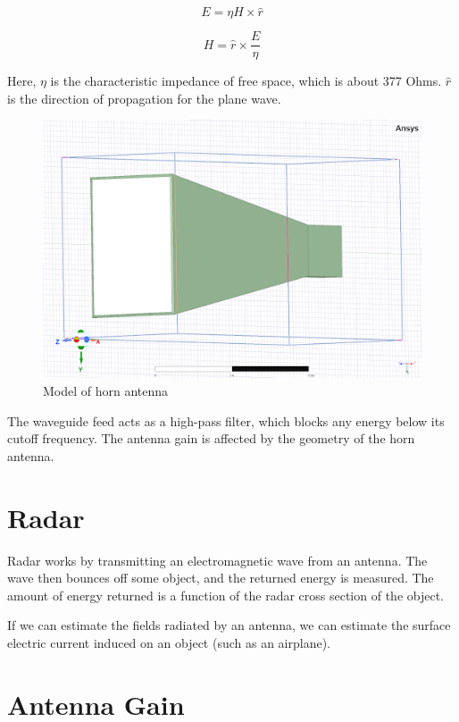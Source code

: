 \documentclass[a4paper,12pt]{report}
\begin{document}
\begin{equation}
  E = \eta H \times \hat{r}
\end{equation}

\begin{equation}
  H = \hat{r} \times \frac{E}{\eta}
\end{equation}

Here, $\eta$ is the characteristic impedance of free space,
which is about 377 Ohms. $\hat{r}$ is the direction of propagation for the plane wave.

\begin{figure}
  \begin{center}
    \includegraphics[clip, keepaspectratio, width=0.5\linewidth]{img/horn_antenna_model.png}
    \caption{Model of horn antenna}
    \label{fig:model_horn_antenna}
  \end{center}
\end{figure}

The waveguide feed acts as a high-pass filter,
which blocks any energy below its cutoff frequency.
The antenna gain is affected by the geometry of the horn antenna.

\section{Radar}

Radar works by transmitting an electromagnetic wave from an antenna.
The wave then bounces off some object, and the returned energy is measured.
The amount of energy returned is a function of the radar cross section of the object.

If we can estimate the fields radiated by an antenna,
we can estimate the surface electric current induced on an object
(such as an airplane).

\section{Antenna Gain}
\end{document}
